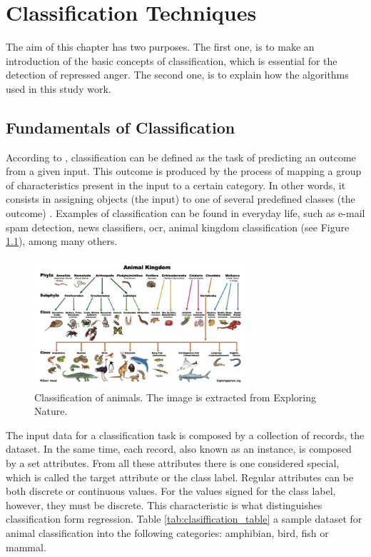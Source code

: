 
\chapter{Classification Techniques}
\label{ch:algorithms}

The aim of this chapter has two purposes. The first one, is to make an introduction of the basic concepts of classification, which is essential for the detection of repressed anger. The second one, is to explain how the algorithms used in this study work.

\section{Fundamentals of Classification}

According to \cite{voznika2007data}, classification can be defined as the task of predicting an outcome from a given input. This outcome is produced by the process of mapping a group of characteristics present in the input to a certain category. In other words, it consists in assigning objects (the input) to one of several predefined classes (the outcome) \cite{pang2006introduction}. Examples of classification can be found in everyday life, such as e-mail spam detection, news classifiers, \acrfull{ocr}, animal kingdom classification (see Figure \ref{fig:animal_classification}), among many others.

\begin{figure}[!htp]
  \center
  \includegraphics[width=0.7\textwidth]{figures/animal_classification}
  \caption{Classification of animals. The image is extracted from Exploring Nature.}
  \label{fig:animal_classification}
\end{figure}

\FloatBarrier

The input data for a classification task is composed by a collection of records, the dataset. In the same time, each record, also known as an instance, is composed by a set attributes. From all these attributes there is one considered special, which is called the target attribute or the class label. Regular attributes can be both discrete or continuous values. For the values signed for the class label, however, they must be discrete. This characteristic is what distinguishes classification form regression. Table \ref{tab:clasiffication_table} a sample dataset for animal classification into the following categories: amphibian, bird, fish or mammal.

